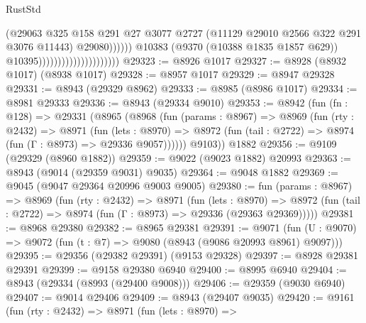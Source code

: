 \begin{lexlean}{RustStd}
\begin{coremodule}
{\begin{coremodule}
{{{{{{{{{{{{{{{{{{{{{{{{{{{{{{{{{{{{{{{                                                        (@29063
                                                          @325
                                                          @158
                                                          @291
                                                          @27
                                                          @3077
                                                          @2727
                                                          (@11129
                                                            @29010
                                                            @2566
                                                            @322
                                                            @291
                                                            @3076
                                                            @11443)
                                                          @29080))))))
                                              @10383
                                              (@9370 (@10388 @1835 @1857 @629))
                                              @10395)))))))))))))))))))))
@29323 := @8926 @1017
@29327 := @8928 (@8932 @1017) (@8938 @1017)
@29328 := @8957 @1017
@29329 := @8947 @29328
@29331 := @8943 (@29329 @8962)
@29333 := @8985 (@8986 @1017)
@29334 := @8981 @29333
@29336 := @8943 (@29334 @9010)
@29353 := @8942
    (fun (fn : @128) =>
    @29331
      (@8965
        (@8968
          (fun (params : @8967) =>
          @8969
            (fun (rty : @2432) =>
            @8971
              (fun (lets : @8970) =>
              @8972 (fun (tail : @2722) => @8974 (fun (Γ : @8973) => @29336 @9057))))))
        @9103))
    @1882
@29356 := @9109 (@29329 (@8960 @1882))
@29359 := @9022 (@9023 @1882) @20993
@29363 := @8943 (@9014 (@29359 @9031) @9035)
@29364 := @9048 @1882
@29369 := @9045 (@9047 @29364 @20996 @9003 @9005)
@29380 := fun (params : @8967) =>
  @8969
    (fun (rty : @2432) =>
    @8971
      (fun (lets : @8970) =>
      @8972 (fun (tail : @2722) => @8974 (fun (Γ : @8973) => @29336 (@29363 @29369)))))
@29381 := @8968 @29380
@29382 := @8965 @29381
@29391 := @9071
    (fun (U : @9070) => @9072 (fun (t : @7) => @9080 (@8943 (@9086 @20993 @8961) @9097)))
@29395 := @29356 (@29382 @29391) (@9153 @29328)
@29397 := @8928 @29381 @29391
@29399 := @9158 @29380 @6940
@29400 := @8995 @6940
@29404 := @8943 (@29334 (@8993 (@29400 @9008)))
@29406 := @29359 (@9030 @6940)
@29407 := @9014 @29406
@29409 := @8943 (@29407 @9035)
@29420 := @9161
    (fun (rty : @2432) =>
    @8971
      (fun (lets : @8970) =>
}}}}}}}}}}}}}}}}}}}}}}}}}}}}}}}}}}}}}}}
\end{coremodule}}
\end{coremodule}
\end{lexlean}
